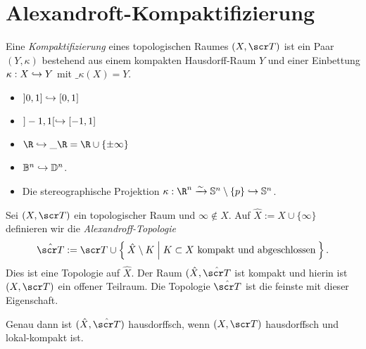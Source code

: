 \section{Alexandroft-Kompaktifizierung}


\begin{df}
	Eine \emph{Kompaktifizierung} eines topologischen Raumes $(X, \scr T)$ ist ein Paar $(Y, \kappa)$ bestehend aus einem kompakten Hausdorff-Raum $Y$ und einer Einbettung $\kappa: X \hookrightarrow Y$ mit $\_{\kappa(X)} = Y$.
\end{df}

\begin{ex}
	\begin{itemize}
		\item
			$]0,1] \hookrightarrow [0,1]$
		\item
			$]-1,1[ \hookrightarrow [-1,1]$
		\item
			$\R \injto \_\R = \R \cup \{\pm\infty\}$
		\item
			$\mathbb{B}^n \hookrightarrow \mathbb{D}^n$.
		\item
			Die stereographische Projektion $\kappa: \R^n \homto \S^n \setminus \{p\} \injto \S^n$.
	\end{itemize}
\end{ex}

\begin{st}[Alexandroft]
	Sei $(X, \scr T)$ ein topologischer Raum und $\infty \not\in X$.
	Auf $\hat X := X \cup \{\infty\}$ definieren wir die \emph{Alexandroff-Topologie}
	\[
		\hat{\scr T} :=
		\scr T \cup \Set{ \hat X \setminus K | K \subset X \text{ kompakt und abgeschlossen} }.
	\]
	Dies ist eine Topologie auf $\hat X$.
	Der Raum $(\hat X, \hat{\scr T}$ ist kompakt und hierin ist $(X, \scr T)$ ein offener Teilraum.
	Die Topologie $\hat{\scr T}$ ist die feinste mit dieser Eigenschaft.

	Genau dann ist $(\hat X, \hat{\scr T})$ hausdorffsch, wenn $(X, \scr T)$ hausdorffsch und lokal-kompakt ist.
\end{st}

